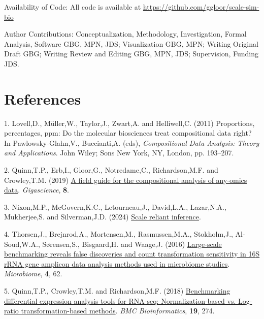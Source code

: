 \documentclass[
]{article}
\newlength{\cslhangindent}
\newenvironment{CSLReferences}[2] %
 {\begin{list}{}{%
  \setlength{\itemindent}{0pt}
  \setlength{\leftmargin}{0pt}
  \setlength{\parsep}{0pt}
  \ifodd #1
   \setlength{\leftmargin}{\cslhangindent}
   \setlength{\itemindent}{-1\cslhangindent}
  \fi
  \setlength{\itemsep}{#2\baselineskip}}}
 {\end{list}}
\begin{document}
Availability of Code: All code is available at
\url{https://github.com/ggloor/scale-sim-bio}

Author Contributions: Conceptualization, Methodology, Investigation,
Formal Analysis, Software GBG, MPN, JDS; Visualization GBG, MPN; Writing
Original Draft GBG; Writing Review and Editing GBG, MPN, JDS;
Supervision, Funding JDS. \singlespacing

\section*{References}\label{references}

\label{refs}
\begin{CSLReferences}{1}{1}
1. Lovell,D., Müller,W., Taylor,J., Zwart,A. and Helliwell,C. (2011)
Proportions, percentages, ppm: Do the molecular biosciences treat
compositional data right? In Pawlowsky-Glahn,V., Buccianti,A. (eds),
\emph{Compositional Data Analysis: Theory and Applications}. John Wiley;
Sons New York, NY, London, pp. 193--207.

2. Quinn,T.P., Erb,I., Gloor,G., Notredame,C., Richardson,M.F. and
Crowley,T.M. (2019) \href{https://doi.org/10.1093/gigascience/giz107}{A
field guide for the compositional analysis of any-omics data}.
\emph{Gigascience}, \textbf{8}.

3. Nixon,M.P., McGovern,K.C., Letourneau,J., David,L.A., Lazar,N.A.,
Mukherjee,S. and Silverman,J.D. (2024)
\href{https://arxiv.org/abs/2201.03616}{Scale reliant inference}.

4. Thorsen,J., Brejnrod,A., Mortensen,M., Rasmussen,M.A., Stokholm,J.,
Al-Soud,W.A., Sørensen,S., Bisgaard,H. and Waage,J. (2016)
\href{https://doi.org/10.1186/s40168-016-0208-8}{Large-scale
benchmarking reveals false discoveries and count transformation
sensitivity in 16{S} r{RNA} gene amplicon data analysis methods used in
microbiome studies}. \emph{Microbiome}, \textbf{4}, 62.

5. Quinn,T.P., Crowley,T.M. and Richardson,M.F. (2018)
\href{https://doi.org/10.1186/s12859-018-2261-8}{Benchmarking
differential expression analysis tools for RNA-seq: Normalization-based
vs. Log-ratio transformation-based methods}. \emph{BMC Bioinformatics},
\textbf{19}, 274.


\end{CSLReferences}
\end{document}
